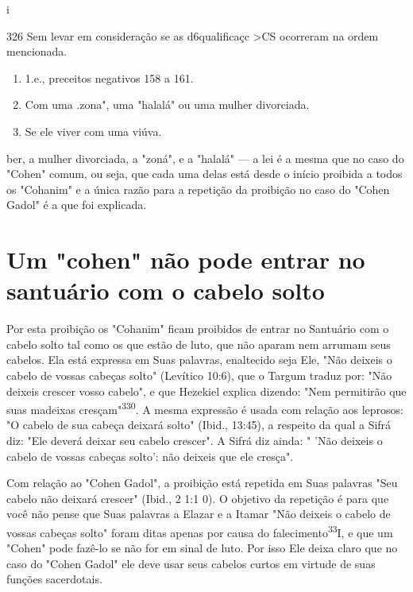 \begin{itemize}
\begin{enumrate}
\begin{itemize}
\begin{itemize}
\begin{itemize}
i

326 Sem levar em consideração se as d6qualificaçc \textgreater CS
ocorreram na ordem mencionada.


\begin{enumerate}
\def\labelenumi{\arabic{enumi}.}
\setcounter{enumi}{326}
\item
 
 1.e., preceitos negativos 158 a 161.
 
\item
 
 Com uma .zona", uma "halalá" ou uma mulher
 divorciada.
 
\item
 
 Se ele viver com uma viúva.
 
\end{enumerate}

ber, a mulher divorciada, a "zoná", e a "halalá" --- a lei é a mesma que
no caso do "Cohen" comum, ou seja, que cada uma delas está desde o
início proibida a todos os "Cohanim" e a única razão para a repetição da
proibição no caso do "Cohen Gadol" é a que foi explicada.

\section{Um "cohen" não pode entrar no santuário com o cabelo solto}

Por esta proibição os "Cohanim" ficam proibidos de entrar no San­tuário
com o cabelo solto tal como os que estão de luto, que não aparam nem
arrumam seus cabelos. Ela está expressa em Suas palavras, enaltecido
seja Ele, "Não deixeis o cabelo de vossas cabeças solto" (Levítico
10:6), que o Targum traduz por: "Não deixeis crescer vosso cabelo", e
que Hezekiel explica dizen­do: "Nem permitirão que suas madeixas
cresçam"\textsuperscript{330}. A mesma expressão é usada com relação aos
leprosos: "O cabelo de sua cabeça deixará solto" (Ibid., 13:45), a
respeito da qual a Sifrá diz: "Ele deverá deixar seu cabelo crescer". A
Sifrá diz ainda: " 'Não deixeis o cabelo de vossas cabeças solto': não
deixeis que ele cresça".

Com relação ao "Cohen Gadol", a proibição está repetida em Suas palavras
"Seu cabelo não deixará crescer" (Ibid., 2 1:1 0). O objetivo da
repeti­ção é para que você não pense que Suas palavras a Elazar e a
Itamar "Não dei­xeis o cabelo de vossas cabeças solto" foram ditas
apenas por causa do falecimento\textsuperscript{33}I, e que um "Cohen"
pode fazê-lo se não for em sinal de luto. Por isso Ele deixa claro que
no caso do "Cohen Gadol" ele deve usar seus ca­belos curtos em virtude
de suas funções sacerdotais.


\end{itemize}
\end{itemize}
\end{itemize}
\end{enumrate}
\end{itemize}
